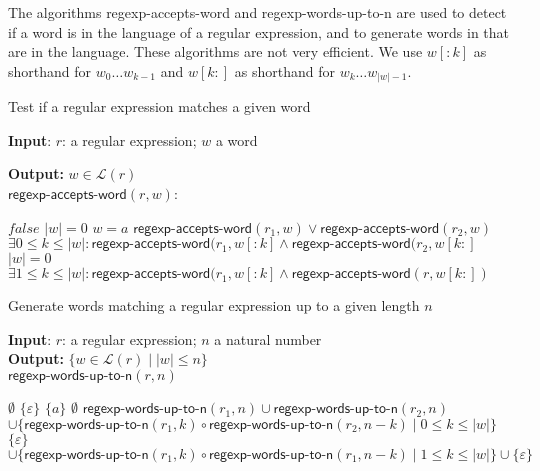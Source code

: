 \documentclass[11pt]{article}
\newcommand*{\Language}[1]{\ensuremath{\mathcal{L}(#1)}}
\begin{document}
The algorithms \textsf{regexp-accepts-word} and \textsf{regexp-words-up-to-n} are used to detect if a word is in the language of a regular expression, and to generate words in that are in the language. These algorithms are not very efficient. We use $w[{:}k]$ as shorthand for $w_0 \ldots w_{k-1}$ and $w[k{:}]$ as shorthand for $w_k \ldots w_{|w|-1}$.

\begin{algorithm}
\small
\caption{Test if a regular expression matches a given word }
\vspace*{1ex}
{\textbf{Input}:}
$r$: a regular expression; $w$ a word

\textbf{Output:}
$w \in \Language{r}$ \\

$\textsf{regexp-accepts-word}(r, w)$:
\begin{algorithmic}[1]
  \State \Return $false$
  \State \Return $|w| = 0$
  \State \Return $w = a$
  \State \Return $\textsf{regexp-accepts-word}(r_1, w) \lor \textsf{regexp-accepts-word}(r_2, w)$
  \State \Return ${ \exists 0 \leq k \leq |w|:
    \textsf{regexp-accepts-word}(r_1, w[{:}k] \land 
    \textsf{regexp-accepts-word}(r_2, w[k{:}] }$
    \State \Return $|w| = 0$
  \Else
  \State \Return ${ \exists 1 \leq k \leq |w|:
    \textsf{regexp-accepts-word}(r_1, w[{:}k] \land 
    \textsf{regexp-accepts-word}(r, w[k{:}]) }$
  \EndIf
\EndIf
\end{algorithmic}
\end{algorithm}

\begin{algorithm}
\small
\caption{Generate words matching a regular expression up to a given length $n$}
\vspace*{1ex}
{\textbf{Input}:}
$r$: a regular expression; $n$ a natural number \\
\textbf{Output:}
$ \{ w \in \Language{r} \mid |w| \leq n \} $ \\

$\textsf{regexp-words-up-to-n}(r, n)$
\begin{algorithmic}[1]
  \State \Return $\emptyset$
  \State \Return $\{ \varepsilon \}$
    \State \Return $\{ a \}$
  \Else
    \State \Return $\emptyset$
  \EndIf
{}
  \State \Return $\textsf{regexp-words-up-to-n}(r_1, n) \cup \textsf{regexp-words-up-to-n}(r_2, n)$
  \State \Return ${ 
    \cup \{ 
      \textsf{regexp-words-up-to-n}(r_1, k) \circ 
      \textsf{regexp-words-up-to-n}(r_2, n-k) 
      \mid 0 \leq k \leq |w|
    \} }$
    \State \Return $\{ \varepsilon \}$
  \Else
    \State \Return ${ 
      \cup \{ 
        \textsf{regexp-words-up-to-n}(r_1, k) \circ 
        \textsf{regexp-words-up-to-n}(r_1, n-k) 
        \mid 1 \leq k \leq |w|
      \} 
        \cup \{ \varepsilon \}
      }$
  \EndIf
\EndIf
\end{algorithmic}
\end{algorithm}
\end{document}
